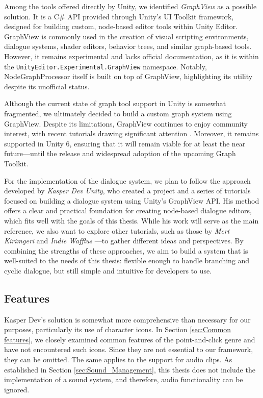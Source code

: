 Among the tools offered directly by Unity, we identified \textit{GraphView} \cite{Unity-GraphView} as a possible solution. It is a C\# API provided through Unity’s UI Toolkit framework, designed for building custom, node-based editor tools within Unity Editor. GraphView is commonly used in the creation of visual scripting environments, dialogue systems, shader editors, behavior trees, and similar graph-based tools. However, it remains experimental and lacks official documentation, as it is within the \verb|UnityEditor.Experimental.GraphView| namespace. Notably, NodeGraphProcessor itself is built on top of GraphView, highlighting its utility despite its unofficial status.

Although the current state of graph tool support in Unity is somewhat fragmented, we ultimately decided to build a custom graph system using GraphView. Despite its limitations, GraphView continues to enjoy community interest, with recent tutorials drawing significant attention \cite{NodeEditor-YT}. Moreover, it remains supported in Unity 6, ensuring that it will remain viable for at least the near future—until the release and widespread adoption of the upcoming Graph Toolkit.

For the implementation of the dialogue system, we plan to follow the approach developed by \textit{Kasper Dev Unity}, who created a project \cite{Kasper-Dialogue-Tutorial-git} and a series of tutorials \cite{Kasper-Dialogue-Tutorial-YT} focused on building a dialogue system using Unity’s GraphView API. His method offers a clear and practical foundation for creating node-based dialogue editors, which fits well with the goals of this thesis. While his work will serve as the main reference, we also want to explore other tutorials, such as those by \textit{Mert Kirimgeri} \cite{merpheus-Dialogue-Tutorial-git}\cite{merpheus-Dialogue-Tutorial-YT} and \textit{Indie Wafflus} \cite{Wafflus-Dialogue-Tutorial-git}\cite{Wafflus-Dialogue-Tutorial-YT}—to gather different ideas and perspectives. By combining the strengths of these approaches, we aim to build a system that is well-suited to the needs of this thesis: flexible enough to handle branching and cyclic dialogue, but still simple and intuitive for developers to use. 

\subsection{Features}
\label{Analysis:Dialogue:Features}
Kasper Dev's solution is somewhat more comprehensive than necessary for our purposes, particularly its use of character icons. In Section \ref{sec:Common features}, we closely examined common features of the point-and-click genre and have not encountered such icons. Since they are not essential to our framework, they can be omitted. The same applies to the support for audio clips. As established in Section \ref{sec:Sound_Management}, this thesis does not include the implementation of a sound system, and therefore, audio functionality can be ignored.

